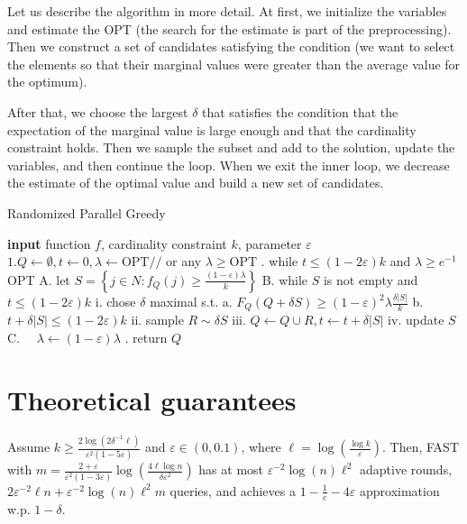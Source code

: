 \documentclass[11pt, a4paper]{article}
\begin{document}
Let us describe the algorithm in more detail. At first, we initialize the variables and estimate the OPT (the search for the estimate is part of the preprocessing). Then we construct a set of candidates satisfying the condition (we want to select the elements so that their marginal values were greater than the average value for the optimum).

After that, we choose the largest $\delta$ that satisfies the condition that the expectation of the marginal value is large enough and that the cardinality constraint holds. Then we sample the subset and add to the solution, update the variables, and then continue the loop. When we exit the inner loop, we decrease the estimate of the optimal value and build a new set of candidates.

\begin{algorithm}[H]
\caption{Randomized Parallel Greedy}
\begin{algorithmic}
    	\STATE \textbf{input} function $f$, cardinality constraint $k$, parameter $\varepsilon$
\STATE$1 . Q \leftarrow \emptyset, t \leftarrow 0, \lambda \leftarrow \mathrm{OPT} / /$ or any $\lambda \geq \mathrm{OPT}$
. while $t \leq(1-2 \varepsilon) k$ and $\lambda \geq e^{-1}$ OPT
\STATE \quad A. let $S=\left\{j \in N: f_{Q}(j) \geq \frac{(1-\varepsilon) \lambda}{k}\right\}$
\STATE \quad B. while $S$ is not empty and $t \leq(1-2 \varepsilon) k$
\STATE \quad \quad i. chose $\delta$ maximal s.t.
\STATE \quad \quad \quad a. $F_{Q}(Q+\delta S) \geq(1-\varepsilon)^{2} \lambda \frac{\delta|S|}{k}$
\STATE \quad \quad \quad b. $t+\delta|S| \leq(1-2 \varepsilon) k$
\STATE \quad \quad ii. sample $R \sim \delta S$
\STATE \quad \quad iii. $Q \leftarrow Q \cup R, t \leftarrow t+\delta|S|$
\STATE \quad \quad iv. update $S$
\STATE \quad C. $\quad \lambda \leftarrow(1-\varepsilon) \lambda$
. return $Q$
  \end{algorithmic}
  \label{alg:full}
\end{algorithm}

\section{Theoretical guarantees}
\begin{theorem}
\label{thm:main_FAST} 
Assume $k \geq \frac{2 \log(2\delta^{-1} \ell)}{\varepsilon^2 (1 - 5\varepsilon)}$ and $\varepsilon \in (0, 0.1)$, where  $\ell = \log(\frac{\log k}{\varepsilon})$. Then, \textsc{FAST} with $m = \frac{2 + \varepsilon}{\varepsilon^2(1 -  3\varepsilon)} \log(\frac{4\ell\log n}{\delta \varepsilon^2})$ has at most $\varepsilon^{-2} \log(n)  \ell^2$  adaptive rounds,   
$2\varepsilon^{-2}  \ell n +  \varepsilon^{-2} \log(n) \ell^2 m$ queries, and achieves a $1 - \frac{1}{e} - 4 \varepsilon$ approximation 
w.p. $1 - \delta$.
\end{theorem} 
\end{document}
